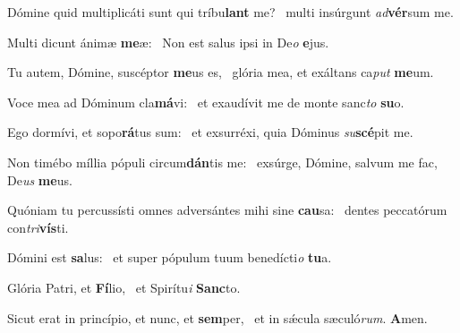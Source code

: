 \item Dómine quid multiplicáti sunt qui tríbu\textbf{lant} me?~\psstar{} multi insúrgunt \textit{ad}\textbf{vér}sum me.
\item Multi dicunt ánimæ \textbf{me}æ:~\psstar{} Non est salus ipsi in De\textit{o} \textbf{e}jus.
\item Tu autem, Dómine, suscéptor \textbf{me}us es,~\psstar{} glória mea, et exáltans ca\textit{put} \textbf{me}um.
\item Voce mea ad Dóminum cla\textbf{má}vi:~\psstar{} et exaudívit me de monte sanc\textit{to} \textbf{su}o.
\item Ego dormívi, et sopo\textbf{rá}tus sum:~\psstar{} et exsurréxi, quia Dóminus \textit{su}\textbf{scé}pit me.
\item Non timébo míllia pópuli circum\textbf{dán}tis me:~\psstar{} exsúrge, Dómine, salvum me fac, De\textit{us} \textbf{me}us.
\item Quóniam tu percussísti omnes adversántes mihi sine \textbf{cau}sa:~\psstar{} dentes peccatórum con\textit{tri}\textbf{vís}ti.
\item Dómini est \textbf{sa}lus:~\psstar{} et super pópulum tuum benedícti\textit{o} \textbf{tu}a.
\item Glória Patri, et \textbf{Fí}lio,~\psstar{} et Spirítu\textit{i} \textbf{Sanc}to.
\item Sicut erat in princípio, et nunc, et \textbf{sem}per,~\psstar{} et in sǽcula sæculó\textit{rum}. \textbf{A}men.
